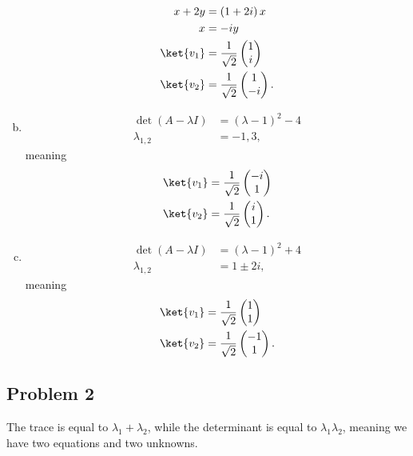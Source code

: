 \documentclass[10pt]{mypackage}
\begin{document}
\begin{enumerate}[(a)]
\begin{align*}
      x + 2y &= \left(1+2i\right)x\\
      x &= -iy\\
      \ket{v_1} &= \frac{1}{\sqrt{2}} \begin{pmatrix}1\\i\end{pmatrix}\\
      \ket{v_2} &= \frac{1}{\sqrt{2}} \begin{pmatrix}1\\-i\end{pmatrix}.
    \end{align*}
  \item 
    \begin{align*}
      \det\left(A - \lambda I\right) &= \left(\lambda - 1\right)^2-4\\
      \lambda_{1,2} &= -1,3,
    \end{align*}
    meaning
    \begin{align*}
      \ket{v_1} &= \frac{1}{\sqrt{2}}\begin{pmatrix}-i\\1\end{pmatrix}\\
      \ket{v_2} &= \frac{1}{\sqrt{2}} \begin{pmatrix}i\\1\end{pmatrix}.
    \end{align*}
  \item 
    \begin{align*}
      \det\left(A - \lambda I\right) &= \left(\lambda - 1\right)^2 + 4\\
      \lambda_{1,2} &= 1\pm 2i,
    \end{align*}
    meaning
    \begin{align*}
      \ket{v_1} &= \frac{1}{\sqrt{2}} \begin{pmatrix}1\\1\end{pmatrix}\\
      \ket{v_2} &= \frac{1}{\sqrt{2}} \begin{pmatrix}-1\\1\end{pmatrix}.
    \end{align*}
\end{enumerate}
\subsection{Problem 2}%
The trace is equal to $\lambda_1 + \lambda_2$, while the determinant is equal to $\lambda_1\lambda_2$, meaning we have two equations and two unknowns.\newline
\end{document}

